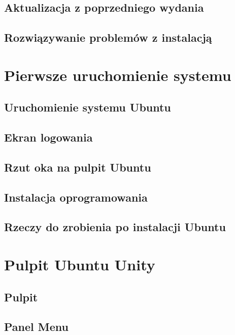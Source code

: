 \documentclass[a4paper,11pt,oneside]{mwart}
\begin{document}
		\subsection{Aktualizacja z poprzedniego wydania}
			
		\subsection{Rozwiązywanie problemów z instalacją}
			
	\section{Pierwsze uruchomienie systemu}
		\subsection{Uruchomienie systemu Ubuntu}
			
		\subsection{Ekran logowania}
			
		\subsection{Rzut oka na pulpit Ubuntu}
			
		\subsection{Instalacja oprogramowania}
			
		\subsection{Rzeczy do zrobienia po instalacji Ubuntu}
			
	\section{Pulpit Ubuntu Unity}
		
	\label{pulpit_unity}
		\subsection{Pulpit}
			 
		\subsection{Panel Menu}
			
\end{document}
